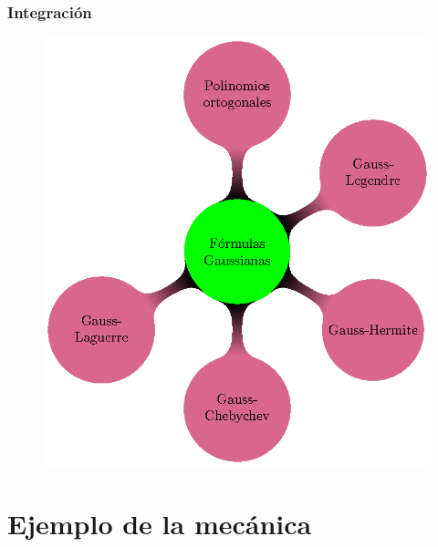 \begin{frame}[fragile]
\frametitle{Integración}
\begin{figure}
    \centering
    \includegraphics[scale=0.6]{Imagenes/MapaMental_Tema2_05.eps}
\end{figure}
\end{frame}
\section{Ejemplo de la mecánica}
